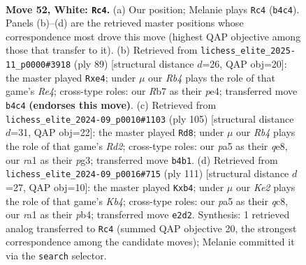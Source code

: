 \documentclass[11pt]{article}
\begin{document}
\clearpage

\begin{figure}[p]\centering
\begin{subfigure}{0.46\textwidth}\centering
\resizebox{\linewidth}{!}{%
\newchessgame
\chessboard[
  setfen={8/1R3p2/4pk2/p7/PR2P3/5P1P/4K3/r7 w - - 0 52},
  showmover=false,
  pgfstyle=straightmove, color=movearrow, markmove={b4-c4}
]}
\caption{}
\end{subfigure}\hfill
\begin{subfigure}{0.46\textwidth}\centering
\resizebox{\linewidth}{!}{%
\newchessgame
\chessboard[
  setfen={8/4p3/5k2/2p1r2p/4PPp1/2R3P1/6K1/8 b - f3 0 45},
  showmover=false,
  pgfstyle=straightmove, color=movearrow, markmove={e5-e4}
]}
\caption{}
\end{subfigure}
\\[4pt]
\begin{subfigure}{0.46\textwidth}\centering
\resizebox{\linewidth}{!}{%
\newchessgame
\chessboard[
  setfen={4Q3/k2r2p1/1p5p/8/PP1r3P/6P1/5PK1/8 b - - 14 53},
  showmover=false,
  pgfstyle=straightmove, color=movearrow, markmove={d7-d8}
]}
\caption{}
\end{subfigure}\hfill
\begin{subfigure}{0.46\textwidth}\centering
\resizebox{\linewidth}{!}{%
\newchessgame
\chessboard[
  setfen={2Q5/p4r2/1p6/1k1p1r2/1P3P2/4P3/P3K3/8 b - - 2 56},
  showmover=false,
  pgfstyle=straightmove, color=movearrow, markmove={b5-b4}
]}
\caption{}
\end{subfigure}
\caption{\textbf{Move 52, White: \texttt{Rc4}.} (a) Our position; Melanie plays \texttt{Rc4} (\texttt{b4c4}). Panels (b)--(d) are the retrieved master positions whose correspondence most drove this move (highest QAP objective among those that transfer to it). (b) Retrieved from \texttt{lichess\_elite\_2025-11\_p0000\#3918} (ply 89) [structural distance $d$=26, QAP obj=20]: the master played \texttt{Rxe4}; under $\mu$ our \emph{Rb4} plays the role of that game's \emph{Re4}; cross-type roles: our \emph{R}b7 as their \emph{p}e4; transferred move \texttt{b4c4} \textbf{(endorses this move)}. (c) Retrieved from \texttt{lichess\_elite\_2024-09\_p0010\#1103} (ply 105) [structural distance $d$=31, QAP obj=22]: the master played \texttt{Rd8}; under $\mu$ our \emph{Rb4} plays the role of that game's \emph{Rd2}; cross-type roles: our \emph{p}a5 as their \emph{q}e8, our \emph{r}a1 as their \emph{p}g3; transferred move \texttt{b4b1}. (d) Retrieved from \texttt{lichess\_elite\_2024-09\_p0016\#715} (ply 111) [structural distance $d$=27, QAP obj=10]: the master played \texttt{Kxb4}; under $\mu$ our \emph{Ke2} plays the role of that game's \emph{Kb4}; cross-type roles: our \emph{p}a5 as their \emph{q}c8, our \emph{r}a1 as their \emph{p}b4; transferred move \texttt{e2d2}. Synthesis: 1 retrieved analog transferred to \texttt{Rc4} (summed QAP objective 20, the strongest correspondence among the candidate moves); Melanie committed it via the \texttt{search} selector.}
\label{fig:thought-m102}
\end{figure}
\end{document}
